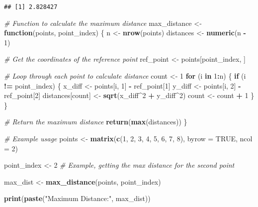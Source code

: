 \documentclass[
]{article}
\newenvironment{Shaded}{\begin{snugshade}}{\end{snugshade}}
\newcommand{\AttributeTok}[1]{\textcolor[rgb]{0.13,0.29,0.53}{#1}}
\newcommand{\CommentTok}[1]{\textcolor[rgb]{0.56,0.35,0.01}{\textit{#1}}}
\newcommand{\ConstantTok}[1]{\textcolor[rgb]{0.56,0.35,0.01}{#1}}
\newcommand{\ControlFlowTok}[1]{\textcolor[rgb]{0.13,0.29,0.53}{\textbf{#1}}}
\newcommand{\DecValTok}[1]{\textcolor[rgb]{0.00,0.00,0.81}{#1}}
\newcommand{\FunctionTok}[1]{\textcolor[rgb]{0.13,0.29,0.53}{\textbf{#1}}}
\newcommand{\NormalTok}[1]{#1}
\newcommand{\OtherTok}[1]{\textcolor[rgb]{0.56,0.35,0.01}{#1}}
\newcommand{\SpecialCharTok}[1]{\textcolor[rgb]{0.81,0.36,0.00}{\textbf{#1}}}
\newcommand{\StringTok}[1]{\textcolor[rgb]{0.31,0.60,0.02}{#1}}
\begin{document}
\begin{verbatim}
## [1] 2.828427
\end{verbatim}

\begin{Shaded}
\begin{Highlighting}[]
\CommentTok{\# Function to calculate the maximum distance}
\NormalTok{max\_distance }\OtherTok{\textless{}{-}} \ControlFlowTok{function}\NormalTok{(points, point\_index) \{}
\NormalTok{  n }\OtherTok{\textless{}{-}} \FunctionTok{nrow}\NormalTok{(points)}
\NormalTok{  distances }\OtherTok{\textless{}{-}} \FunctionTok{numeric}\NormalTok{(n }\SpecialCharTok{{-}} \DecValTok{1}\NormalTok{)}
  
  \CommentTok{\# Get the coordinates of the reference point}
\NormalTok{  ref\_point }\OtherTok{\textless{}{-}}\NormalTok{ points[point\_index, ]}
  
  \CommentTok{\# Loop through each point to calculate distance}
\NormalTok{  count }\OtherTok{\textless{}{-}} \DecValTok{1}
  \ControlFlowTok{for}\NormalTok{ (i }\ControlFlowTok{in} \DecValTok{1}\SpecialCharTok{:}\NormalTok{n) \{}
    \ControlFlowTok{if}\NormalTok{ (i }\SpecialCharTok{!=}\NormalTok{ point\_index) \{}
\NormalTok{      x\_diff }\OtherTok{\textless{}{-}}\NormalTok{ points[i, }\DecValTok{1}\NormalTok{] }\SpecialCharTok{{-}}\NormalTok{ ref\_point[}\DecValTok{1}\NormalTok{]}
\NormalTok{      y\_diff }\OtherTok{\textless{}{-}}\NormalTok{ points[i, }\DecValTok{2}\NormalTok{] }\SpecialCharTok{{-}}\NormalTok{ ref\_point[}\DecValTok{2}\NormalTok{]}
\NormalTok{      distances[count] }\OtherTok{\textless{}{-}} \FunctionTok{sqrt}\NormalTok{(x\_diff}\SpecialCharTok{\^{}}\DecValTok{2} \SpecialCharTok{+}\NormalTok{ y\_diff}\SpecialCharTok{\^{}}\DecValTok{2}\NormalTok{)}
\NormalTok{      count }\OtherTok{\textless{}{-}}\NormalTok{ count }\SpecialCharTok{+} \DecValTok{1}
\NormalTok{    \}}
\NormalTok{  \}}
  
  \CommentTok{\# Return the maximum distance}
  \FunctionTok{return}\NormalTok{(}\FunctionTok{max}\NormalTok{(distances))}
\NormalTok{\}}

\CommentTok{\# Example usage}
\NormalTok{points }\OtherTok{\textless{}{-}} \FunctionTok{matrix}\NormalTok{(}\FunctionTok{c}\NormalTok{(}\DecValTok{1}\NormalTok{, }\DecValTok{2}\NormalTok{,}
                   \DecValTok{3}\NormalTok{, }\DecValTok{4}\NormalTok{,}
                   \DecValTok{5}\NormalTok{, }\DecValTok{6}\NormalTok{,}
                   \DecValTok{7}\NormalTok{, }\DecValTok{8}\NormalTok{), }\AttributeTok{byrow =} \ConstantTok{TRUE}\NormalTok{, }\AttributeTok{ncol =} \DecValTok{2}\NormalTok{)}

\NormalTok{point\_index }\OtherTok{\textless{}{-}} \DecValTok{2}  \CommentTok{\# Example, getting the max distance for the second point}

\NormalTok{max\_dist }\OtherTok{\textless{}{-}} \FunctionTok{max\_distance}\NormalTok{(points, point\_index)}

\FunctionTok{print}\NormalTok{(}\FunctionTok{paste}\NormalTok{(}\StringTok{"Maximum Distance:"}\NormalTok{, max\_dist))}
\end{Highlighting}
\end{Shaded}
\end{document}
